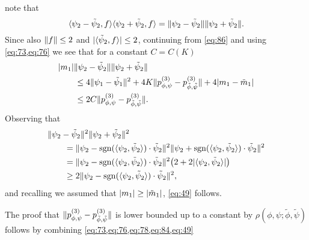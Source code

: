 \documentclass[journal]{IEEEtran}
\newcommand{\sgn}{\mathrm{sgn}}
\newcommand{\1}{\boldsymbol{1}}
\DeclarePairedDelimiter{\Inner}{\langle}{\rangle}
\DeclarePairedDelimiter{\brackets}{(}{)}
\DeclarePairedDelimiter{\norm}{\lVert}{\rVert}
\DeclarePairedDelimiter{\abs}{\lvert}{\rvert}
\begin{document}
note that
\begin{equation*}
	\Inner{\psi_2 - \tilde{\psi}_2,f}\Inner{\psi_2 + \tilde{\psi}_2,f}%
	= \norm{\psi_2 - \tilde{\psi}_2} \norm{\psi_2 + \tilde{\psi}_2}.
\end{equation*}
Since also $\norm{f}\leq 2$ and $\abs{\Inner{\tilde{\psi}_2,f}} \leq 2$, continuing from \cref{eq:86} and using \cref{eq:73,eq:76} we see that for a constant $C=C(K)$
\begin{align*}
	&\abs{m_1}\norm{\psi_2 - \tilde{\psi}_2} \norm{\psi_2 + \tilde{\psi}_2}\\%
	&\qquad\leq 4\norm{\psi_1 - \tilde{\psi}_1}^2 + 4K\norm{p_{\phi,\psi}^{(3)} - p_{\tilde{\phi},\tilde{\psi}}^{(3)}}%
	+  4\abs{m_1 - \tilde{m}_1}\\
	&\qquad\leq 2C  \norm{p_{\phi,\psi}^{(3)} - p_{\tilde{\phi},\tilde{\psi}}^{(3)}}.%
\end{align*}
Observing that
\begin{align*}
	&\norm{\psi_2 - \tilde{\psi}_2}^2\norm{\psi_2 + \tilde{\psi}_2}^2\\%
	&\qquad=\norm{\psi_2 - \sgn(\Inner{\psi_2,\tilde{\psi}_2})\cdot\tilde{\psi}_2}^2 \norm{\psi_2 + \sgn(\Inner{\psi_2,\tilde{\psi}_2})\cdot \tilde{\psi}_2}^2\\
	&\qquad=\norm{\psi_2 - \sgn(\Inner{\psi_2,\tilde{\psi}_2})\cdot\tilde{\psi}_2}^2\brackets[\big]{2 + 2 \abs{\Inner{\psi_2,\tilde{\psi}_2}} }\\
	&\qquad\geq 2\norm{\psi_2 - \sgn(\Inner{\psi_2,\tilde{\psi}_2})\cdot\tilde{\psi}_2}^2,
\end{align*}
and recalling we assumed that $\abs{m_1}\geq \abs{\tilde{m}_1}$, \cref{eq:49} follows.

The proof that $\norm{p^{(3)}_{\phi,\psi}-p^{(3)}_{\tilde{\phi},\tilde{\psi}}}$ is lower bounded up to a constant by $\rho(\phi,\psi;\tilde{\phi},\tilde{\psi})$ follows by combining \cref{eq:73,eq:76,eq:78,eq:84,eq:49}
\end{document}
